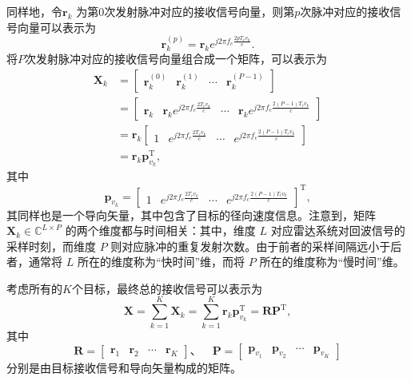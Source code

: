 同样地，令\( \bm{r}_k \) 为第0次发射脉冲对应的接收信号向量，则第\( p \)次脉冲对应的接收信号向量可以表示为
\[
    \bm{r}_k^{(p)} = \bm{r}_k e^{j 2 \pi f_c \frac{2 p T_r v_k}{c}}.
\]
将\( P \)次发射脉冲对应的接收信号向量组合成一个矩阵，可以表示为
\[
    \begin{split}
        \mathbf{X}_k & = \begin{bmatrix}
                             \bm{r}_k^{(0)} & \bm{r}_k^{(1)} & \cdots & \bm{r}_k^{(P-1)}
                         \end{bmatrix}                                                             \\
                     & = \begin{bmatrix}
                             \bm{r}_k & \bm{r}_k e^{j 2 \pi f_c \frac{2 T_r v_k}{c}} & \cdots & \bm{r}_k e^{j 2 \pi f_c \frac{2 (P-1) T_r v_k}{c}}
                         \end{bmatrix} \\
                     & = \bm{r}_k \begin{bmatrix}
                                      1 & e^{j 2 \pi f_c \frac{2 T_r v_k}{c}} & \cdots & e^{j 2 \pi f_c \frac{2 (P-1) T_r v_k}{c}}
                                  \end{bmatrix}                 \\
                     & = \bm{r}_k \bm{p}_{v_k}^{\mathrm{T}},
    \end{split}
\]
其中
\[
    \bm{p}_{v_k} = \begin{bmatrix}
        1 & e^{j 2 \pi f_c \frac{2 T_r v_k}{c}} & \cdots & e^{j 2 \pi f_c \frac{2 (P-1) T_r v_k}{c}}
    \end{bmatrix}^{\mathrm{T}},
\]
其同样也是一个导向矢量，其中包含了目标的径向速度信息。注意到，矩阵 \( \mathbf{X}_k \in \mathbb{C}^{L \times P} \) 的两个维度都与时间相关：其中，维度 \(L\) 对应雷达系统对回波信号的采样时刻，而维度 \(P\) 则对应脉冲的重复发射次数。由于前者的采样间隔远小于后者，通常将 \(L\) 所在的维度称为``快时间''维，而将 \(P\) 所在的维度称为``慢时间''维。

考虑所有的\( K \)个目标，最终总的接收信号可以表示为
\[
    \mathbf{X} = \sum_{k=1}^{K} \mathbf{X}_k = \sum_{k=1}^{K} \bm{r}_k \bm{p}_{v_k}^{\mathrm{T}} = \mathbf{R} \mathbf{P}^{\mathrm{T}},
\]
其中
\[
    \mathbf{R} = \begin{bmatrix}
        \bm{r}_1 & \bm{r}_2 & \cdots & \bm{r}_K
    \end{bmatrix}\text{、} \quad \mathbf{P} = \begin{bmatrix}
        \bm{p}_{v_1} & \bm{p}_{v_2} & \cdots & \bm{p}_{v_K}
    \end{bmatrix}
\]
分别是由目标接收信号和导向矢量构成的矩阵。

